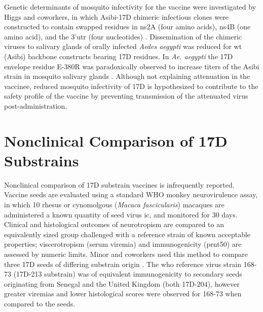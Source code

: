 Genetic determinants of mosquito infectivity for the vaccine were investigated by Higgs and coworkers, in which Asibi-17D chimeric infectious clones were constructed to contain swapped residues in \gls{ns}2A (four amino acids), \gls{ns}4B (one amino acid), and the 3’\gls{utr} (four nucleotides) \parencite{McElroy:2006wb}. Dissemination of the chimeric viruses to salivary glands of orally infected \emph{Aedes aegypti} was reduced for \gls{wt} (Asibi) backbone constructs bearing 17D residues. In \emph{Ae. aegypti} the 17D envelope residue E-380R was paradoxically observed to increase titers of the Asibi strain in mosquito salivary glands \parencite{Huang:2014cy}. Although not explaining attenuation in the vaccinee, reduced mosquito infectivity of 17D is hypothesized to contribute to the safety profile of the vaccine by preventing transmission of the attenuated virus post-administration.

\section{Nonclinical Comparison of 17D Substrains}
Nonclinical comparison of 17D substrain vaccines is infrequently reported. Vaccine seeds are evaluated using a standard WHO monkey neurovirulence assay, in which 10 rhesus or cynomolgous (\emph{Macaca fascicularis}) macaques are administered a known quantity of seed virus \gls{ic}, and monitored for 30 days. Clinical and histological outcomes of neurotropism are compared to an equivalently sized group challenged with a reference strain of known acceptable properties; viscerotropism (serum viremia) and immunogenicity (\gls{prnt50}) are assessed by numeric limits. Minor and coworkers used this method to compare three 17D seeds of differing substrain origin \parencite{Minor:2011hk}. The \gls{who} reference virus strain 168-73 (17D-213 substrain) was of equivalent immunogenicity to secondary seeds originating from Senegal and the United Kingdom (both 17D-204), however greater viremias and lower histological scores were observed for 168-73 when compared to the seeds. 

